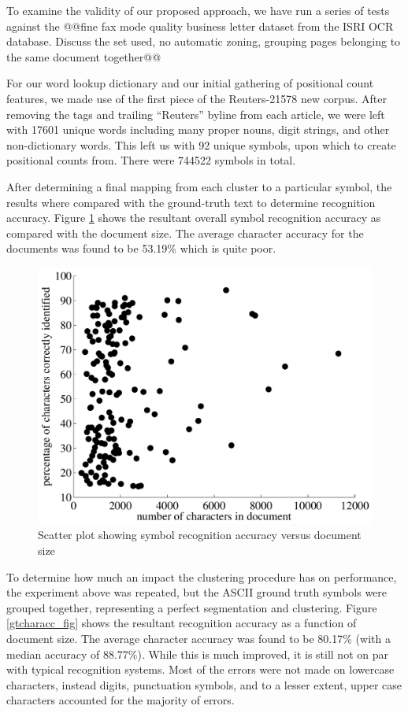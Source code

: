 \documentclass[times, 10pt,twocolumn]{article}
\begin{document}
To examine the validity of our proposed approach, we have run a series of tests
against the @@fine fax mode quality business letter dataset from the ISRI OCR
database\cite{nartker2005}.  Discuss the set used, no automatic zoning,
grouping pages belonging to the same document together@@

For our word lookup dictionary and our initial gathering of positional count
features, we made use of the first piece of the Reuters-21578 new
corpus\cite{lewis2004}.  After removing the tags and trailing ``Reuters''
byline from each article, we were left with 17601 unique words including many
proper nouns, digit strings, and other non-dictionary words.  This left us with
92 unique symbols, upon which to create positional counts from.  There were
744522 symbols in total.

After determining a final mapping from each cluster to a particular symbol, the
results where compared with the ground-truth text to determine recognition
accuracy.  Figure \ref{characc_fig} shows the resultant overall symbol
recognition accuracy as compared with the document size.  The average character
accuracy for the documents was found to be 53.19\% which is quite poor.

\begin{figure}[ht]
  \centering
  \includegraphics[scale=.4]{figures/character_accuracy}
  \caption{Scatter plot showing symbol recognition accuracy versus document
  size}
  \label{characc_fig}
\end{figure}

To determine how much an impact the clustering procedure has on performance,
the experiment above was repeated, but the ASCII ground truth symbols were
grouped together, representing a perfect segmentation and clustering.  Figure
\ref{gtcharacc_fig} shows the resultant recognition accuracy as a function of
document size.  The average character accuracy was found to be 80.17\% (with a
median accuracy of 88.77\%).  While this is much improved, it is still not on
par with typical recognition systems.  Most of the errors were not made on
lowercase characters, instead digits, punctuation symbols, and to a lesser
extent, upper case characters accounted for the majority of errors.
\end{document}
